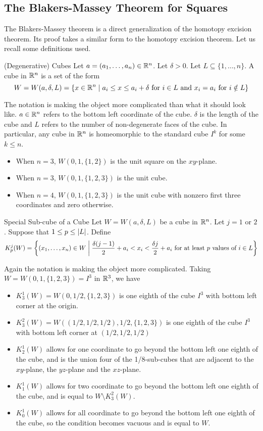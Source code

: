 \documentclass[a4paper]{article}
\begin{document}
\subsection{The Blakers-Massey Theorem for Squares}
The Blakers-Massey theorem is a direct generalization of the homotopy excision theorem. Its proof takes a similar form to the homotopy excision theorem. Let us recall some definitions used. 

\begin{defn}{(Degenerative) Cubes}{} Let $a=(a_1,\dots,a_n)\in\mathbb{R}^n$. Let $\delta>0$. Let $L\subseteq\{1,\dots,n\}$. A cube in $\mathbb{R}^n$ is a set of the form $$W=W(a,\delta,L)=\{x\in\mathbb{R}^n\;|\;a_i\leq x\leq a_i+\delta\text{ for }i\in L\text{ and }x_i=a_i\text{ for }i\notin L\}$$
\end{defn}

The notation is making the object more complicated than what it should look like. $a\in\mathbb{R}^n$ refers to the bottom left coordinate of the cube. $\delta$ is the length of the cube and $L$ refers to the number of non-degenerate faces of the cube. In particular, any cube in $\mathbb{R}^n$ is homeomorphic to the standard cube $I^k$ for some $k\leq n$. 
\begin{itemize}
\item When $n=3$, $W(0,1,\{1,2\})$ is the unit square on the $xy$-plane. 
\item When $n=3$, $W(0,1,\{1,2,3\})$ is the unit cube. 
\item When $n=4$, $W(0,1,\{1,2,3\})$ is the unit cube with nonzero first three coordinates and zero otherwise. 
\end{itemize}

\begin{defn}{Special Sub-cube of a Cube}{} Let $W=W(a,\delta,L)$ be a cube in $\mathbb{R}^n$. Let $j=1$ or $2$. Suppose that $1\leq p\leq\abs{L}$. Define $$K_p^j(W)=\left\{(x_1,\dots,x_n)\in W\;\bigg{|}\;\frac{\delta(j-1)}{2}+a_i<x_i<\frac{\delta j}{2}+a_i\text{ for at least }p\text{ values of }i\in L\right\}$$
\end{defn}

Again the notation is making the object more complicated. Taking $W=W(0,1,\{1,2,3\})=I^3$ in $\mathbb{R}^3$, we have 
\begin{itemize}
\item $K_3^1(W)=W(0,1/2,\{1,2,3\})$ is one eighth of the cube $I^3$ with bottom left corner at the origin. 
\item $K_3^2(W)=W((1/2,1/2,1/2),1/2,\{1,2,3\})$ is one eighth of the cube $I^3$ with bottom left corner at $(1/2,1/2,1/2)$
\item $K_2^1(W)$ allows for one coordinate to go beyond the bottom left one eighth of the cube, and is the union four of the 1/8-sub-cubes that are adjacent to the $xy$-plane, the $yz$-plane and the $xz$-plane. 
\item $K_1^1(W)$ allows for two coordinate to go beyond the bottom left one eighth of the cube, and is equal to $W\setminus K_3^2(W)$. 
\item $K_0^1(W)$ allows for all coordinate to go beyond the bottom left one eighth of the cube, so the condition becomes vacuous and is equal to $W$. 
\end{itemize}
\end{document}
